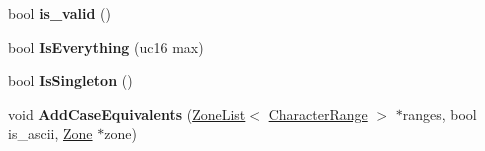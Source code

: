 \begin{DoxyCompactItemize}
\item 
\hypertarget{classv8_1_1internal_1_1_character_range_a291c287ee7cb98c102dc433db3aac1e6}{}bool {\bfseries is\+\_\+valid} ()\label{classv8_1_1internal_1_1_character_range_a291c287ee7cb98c102dc433db3aac1e6}

\item 
\hypertarget{classv8_1_1internal_1_1_character_range_ada7f7e22bf26b62a0dfa8d7c65f5469e}{}bool {\bfseries Is\+Everything} (uc16 max)\label{classv8_1_1internal_1_1_character_range_ada7f7e22bf26b62a0dfa8d7c65f5469e}

\item 
\hypertarget{classv8_1_1internal_1_1_character_range_aef36eef7241d9380d60df9a8bbaf71ec}{}bool {\bfseries Is\+Singleton} ()\label{classv8_1_1internal_1_1_character_range_aef36eef7241d9380d60df9a8bbaf71ec}

\item 
\hypertarget{classv8_1_1internal_1_1_character_range_a4e51530ff07723d03f0516cca14db76c}{}void {\bfseries Add\+Case\+Equivalents} (\hyperlink{classv8_1_1internal_1_1_zone_list}{Zone\+List}$<$ \hyperlink{classv8_1_1internal_1_1_character_range}{Character\+Range} $>$ $\ast$ranges, bool is\+\_\+ascii, \hyperlink{classv8_1_1internal_1_1_zone}{Zone} $\ast$zone)\label{classv8_1_1internal_1_1_character_range_a4e51530ff07723d03f0516cca14db76c}

\end{DoxyCompactItemize}
